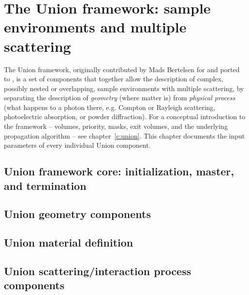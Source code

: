 
\chapter{The Union framework: sample environments and multiple scattering}
\label{c:union-comp}

The Union framework, originally contributed by Mads Bertelsen for \MCS
and ported to \MCX, is a set of components that together allow the
description of complex, possibly nested or overlapping, sample
environments with multiple scattering, by separating the description of
\emph{geometry} (where matter is) from \emph{physical process} (what
happens to a photon there, e.g. Compton or Rayleigh scattering,
photoelectric absorption, or powder diffraction). For a conceptual
introduction to the framework -- volumes, priority, masks, exit volumes,
and the underlying propagation algorithm -- see chapter~\ref{c:union}.
This chapter documents the input parameters of every individual Union
component.

\section{Union framework core: initialization, master, and termination}




\section{Union geometry components}





\section{Union material definition}


\section{Union scattering/interaction process components}






